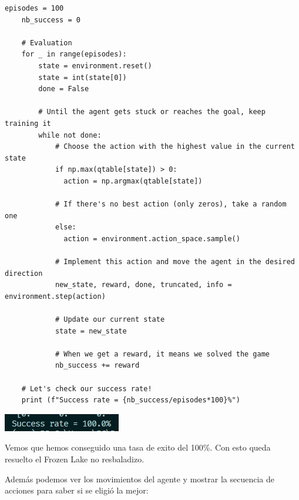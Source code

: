 \documentclass{article}
\begin{document}
\vspace{0.5cm}

\begin{lstlisting}[style=mystyle]
    episodes = 100
    nb_success = 0
    
    # Evaluation
    for _ in range(episodes):
        state = environment.reset()
        state = int(state[0])
        done = False
        
        # Until the agent gets stuck or reaches the goal, keep training it
        while not done:
            # Choose the action with the highest value in the current state
            if np.max(qtable[state]) > 0:
              action = np.argmax(qtable[state])
    
            # If there's no best action (only zeros), take a random one
            else:
              action = environment.action_space.sample()
              
            # Implement this action and move the agent in the desired direction
            new_state, reward, done, truncated, info = environment.step(action)
           
            # Update our current state
            state = new_state
    
            # When we get a reward, it means we solved the game
            nb_success += reward
    
    # Let's check our success rate!
    print (f"Success rate = {nb_success/episodes*100}%")
\end{lstlisting}

\vspace{0.5cm}

\begin{center}
    \includegraphics[width=0.75\linewidth]{successrate.png}
\end{center}

\vspace{0.5cm}

Vemos que hemos conseguido una tasa de exito del 100\%. Con esto queda resuelto el Frozen Lake no resbaladizo.

\vspace{0.5cm}

Además podemos ver los movimientos del agente y mostrar la secuencia de acciones para saber si se eligió la mejor:
\end{document}
